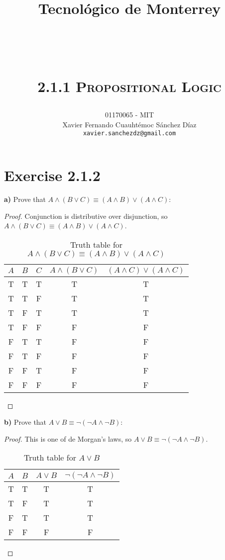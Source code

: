 \documentclass[titlepage, letterpaper, fleqn]{article}
\title{
\vspace{1in}
\textbf{Tecnológico de Monterrey} \\
\vspace{0.5in}
\textmd{\mahclass} \\
\large{\textit{\mahteacher}} \\
\vspace{0.5in}
\textsc{\mahtitle}\\
\textsc{2.1.1 Propositional Logic}\\
\author{01170065  - MIT \\
Xavier Fernando Cuauhtémoc Sánchez Díaz \\
\texttt{xavier.sanchezdz@gmail.com}}
\date{\mahdate}
}
\begin{document}
\begin{titlepage}
\maketitle
\end{titlepage}

%
%

\section{Exercise 2.1.2}

{\large \textbf{a)} Prove that \(A \wedge (B \vee C) \equiv (A \wedge B) \vee (A \wedge C)\):}

\begin{proof}
Conjunction is distributive over disjunction, so \(A \wedge (B \vee C) \equiv (A \wedge B) \vee (A \wedge C)\).

\begin{table}[h!]
\centering
\begin{tabular}{@{}ccccc@{}}
\toprule
\multicolumn{1}{l}{$A$} & \multicolumn{1}{l}{$B$} & \multicolumn{1}{l}{$C$} & \multicolumn{1}{l}{$A \wedge (B \vee C)$} & \multicolumn{1}{l}{$(A \wedge C) \vee (A \wedge C)$} \\ \midrule
T & T & T & T & T \\
T & T & F & T & T \\
T & F & T & T & T \\
T & F & F & F & F \\
F & T & T & F & F \\
F & T & F & F & F \\
F & F & T & F & F \\
F & F & F & F & F \\ \bottomrule
\end{tabular}
\caption{Truth table for \(A \wedge (B \vee C) \equiv (A \wedge B) \vee (A \wedge C)\)}
\label{fig:a}
\end{table}
\end{proof}

{\large \textbf{b)} Prove that \(A \vee B \equiv \neg(\neg A \wedge \neg B)\):}

\begin{proof}
This is one of de Morgan's laws, so \(A \vee B \equiv \neg(\neg A \wedge \neg B)\).

\begin{table}[h!]
\centering
\begin{tabular}{@{}cccc@{}}
\toprule
\multicolumn{1}{l}{$A$} & \multicolumn{1}{l}{$B$} & \multicolumn{1}{l}{$A \vee B$} & \multicolumn{1}{l}{$\neg (\neg A \wedge \neg B)$} \\ \midrule
T & T & T & T \\
T & F & T & T \\
F & T & T & T \\
F & F & F & F \\ \bottomrule
\end{tabular}
\caption{Truth table for \(A \vee B\)}
\label{fig:b}
\end{table}
\end{proof}
\end{document}
